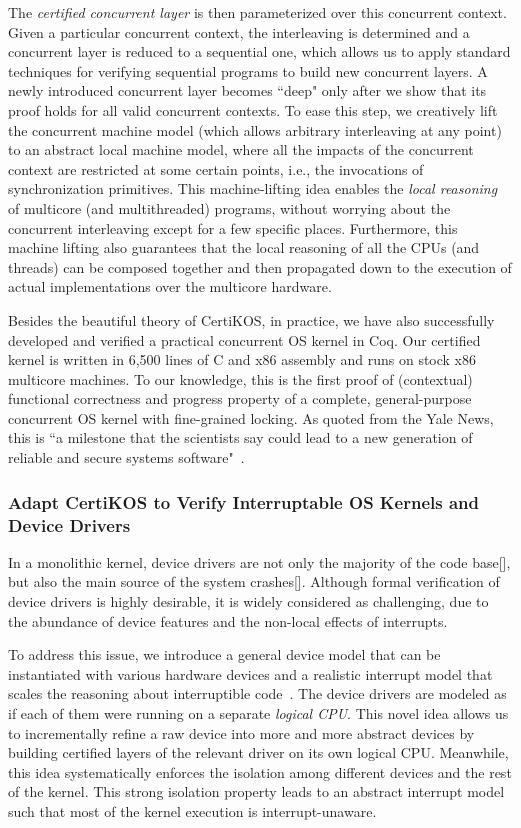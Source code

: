 \documentclass[a4paper, 10pt]{article}
\begin{document}
\begin{small}
The \emph{certified concurrent layer}  is then parameterized over this concurrent context.
Given a particular concurrent context,
the interleaving is determined
and a concurrent layer is reduced to a sequential one, which allows us to apply standard techniques for
verifying sequential programs to build new concurrent layers.
A newly introduced concurrent layer becomes ``deep" only after we show that its proof holds for all valid concurrent contexts.
To ease this step, we creatively lift the concurrent machine model (which allows arbitrary interleaving at any point) to an abstract local machine model,
where all the impacts of the concurrent context are restricted at
some certain points, i.e.,
the invocations of synchronization primitives. This machine-lifting idea
enables the \emph{local reasoning} of multicore (and multithreaded) programs,
without worrying about the concurrent interleaving except for a few specific places. Furthermore, this machine lifting also guarantees that the local reasoning of all the
CPUs (and threads) can be composed together
and then 
propagated down to the execution of actual 
implementations over the  multicore hardware.

 
Besides the beautiful theory of CertiKOS, in practice,
we have also successfully developed and verified a practical concurrent OS
kernel in Coq. Our certified kernel is written in 6,500 lines of
C and x86 assembly and runs on stock x86 multicore
machines. To our knowledge, this is the first proof of
(contextual) functional correctness and progress
property of a complete, general-purpose
concurrent OS kernel with fine-grained locking.
As quoted from the Yale News, this is ``a milestone that the scientists say could lead to a new generation of reliable and secure systems software"~\cite{news}.

\subsubsection*{\small Adapt CertiKOS to Verify Interruptable OS Kernels and Device Drivers}
In a monolithic kernel,
device drivers are not only the majority of the code base[],
but also the main source of the system crashes[].
Although formal verification of device drivers is highly desirable, it is widely considered as challenging, due to the abundance of device features
and the non-local effects of interrupts.

To address this issue, we introduce
a general device model that can be
instantiated with various hardware devices and a realistic
interrupt model that scales the reasoning
about interruptible code~\cite{pldi16-device}. 
The device drivers are modeled
as if each of them were running on a  separate \emph{logical CPU}. This novel idea allows us to
incrementally refine a raw
device into more and more abstract devices
by building certified layers of the relevant driver on its own logical CPU.
Meanwhile, this idea systematically enforces
the isolation among different devices and the
rest of the kernel. This strong isolation property 
leads to an abstract interrupt model such that
most of the kernel execution is interrupt-unaware.


\end{small}
\end{document}

